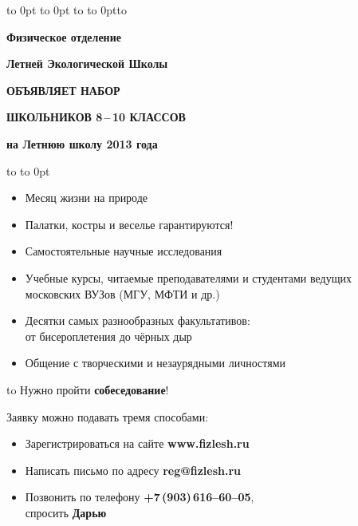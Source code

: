 \documentclass[a5paper,12pt]{article}
\begin{document}
\vbox to 0pt{%
\vbox to 0pt{\vskip9pt
\hbox to \vss}%
\vss%
\vbox to 0pt{\hbox to \vss}%
}%
\vskip28pt
\centerline{}
\vskip34pt
\centerline{\large\textbf{Физическое отделение}}
\vskip6pt
\centerline{\large\textbf{Летней Экологической Школы}}
\vskip9pt
\centerline{\Large\textsf{\textbf{ОБЪЯВЛЯЕТ НАБОР}}}
\vskip 9pt
\centerline{\Large\textsf{\textbf{ШКОЛЬНИКОВ 8\,--\,10 КЛАССОВ}}}
\vskip 6pt
\centerline{\large\textbf{на Летнюю школу 2013 года}}
\vskip12pt
\hbox to 
\vskip-24pt\hbox to 0pt{}

{\large%
\begin{itemize}
\setlength{\itemsep}{-4pt}
\setlength{\parindent}{0pt}
\item Месяц жизни на природе
\item Палатки, костры и веселье гарантируются!
\item Самостоятельные научные исследования
\item Учебные курсы, читаемые преподавателями и студентами ведущих московских ВУЗов (МГУ, МФТИ и др.)
\item Десятки самых разнообразных факультативов:\\от бисероплетения до чёрных дыр
\item Общение с творческими и незаурядными личностями
\end{itemize}

\hbox to 
\vskip6pt
Нужно пройти \textbf{собеседование}!\par
Заявку можно подавать тремя способами:
\begin{itemize}
\setlength{\itemsep}{-4pt}
\item Зарегистрироваться на сайте \textbf{www.fizlesh.ru}
\item Написать письмо по адресу \textbf{reg@fizlesh.ru}
\item Позвонить по телефону \textbf{+7\,(903)\,616--60--05},\\
спросить \textbf{Дарью}
\end{itemize}
}%
\end{document}
